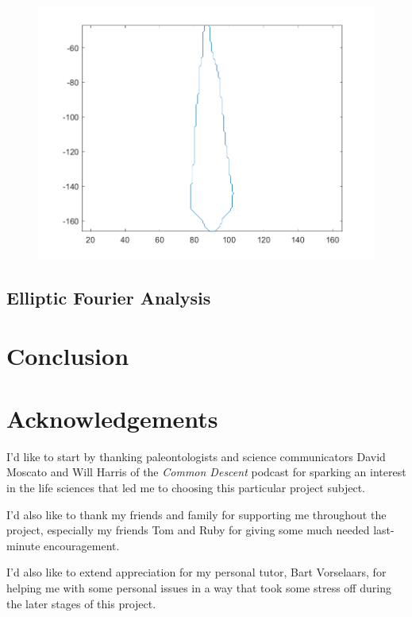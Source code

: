 \documentclass[12pt,english]{article}
\begin{document}
\begin{figure}[!hbt]
\begin{centre}
\begin{minipage}{0.32\textwidth}
		\label{contour:3}
		\includegraphics[width=\textwidth]{../code/contour/contour/subulate}
	\end{minipage}
\end{centre}
\end{figure}

\subsection{Elliptic Fourier Analysis}

\section{Conclusion}

\section{Acknowledgements}
I'd like to start by thanking paleontologists and science communicators
David Moscato and Will Harris of the \textit{Common Descent} podcast \cite{moscato:2024}
for sparking an interest in the life sciences that led me to choosing
this particular project subject.

I'd also like to thank my friends and family for supporting me throughout the project,
especially my friends Tom and Ruby for giving some much needed last-minute encouragement.

I'd also like to extend appreciation for my personal tutor, Bart Vorselaars,
for helping me with some personal issues in a way that took some stress off during
the later stages of this project.
\end{document}
